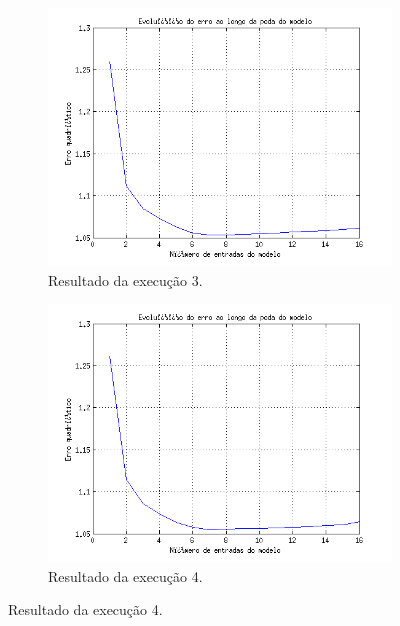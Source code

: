 \begin{figure}[H]
			\begin{subfigure}{.5\textwidth}
				  \centering
				  \includegraphics[width=1\linewidth]{image/backward3_2}
				  \caption{Resultado da execução 3.}
				  \label{backward3_2}
				\end{subfigure}%
				\begin{subfigure}{.5\textwidth}
				  \centering
				  \includegraphics[width=1\linewidth]{image/backward4_2}
				  \caption{Resultado da execução 4.}
				  \label{backward4_2}
				\end{subfigure}			
			

\end{figure}
